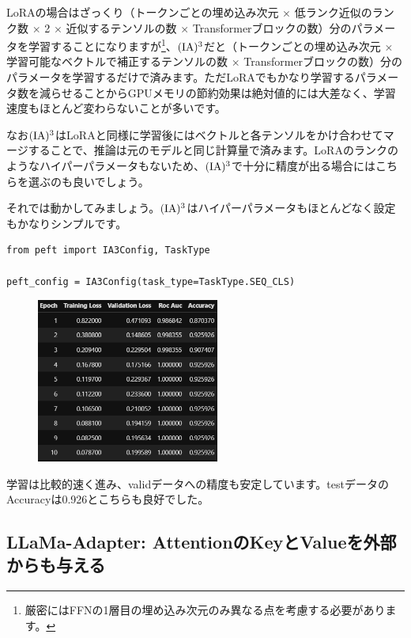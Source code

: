 \documentclass[a5paper,twoside,dvipdfmx]{jsarticle}
\begin{document}
LoRAの場合はざっくり（トークンごとの埋め込み次元 $\times$ 低ランク近似のランク数 $\times$ 2 $\times$ 近似するテンソルの数 $\times$ Transformerブロックの数）分のパラメータを学習することになりますが\footnote{厳密にはFFNの1層目の埋め込み次元のみ異なる点を考慮する必要があります。}、$\rm{(IA)^3}$だと（トークンごとの埋め込み次元 $\times$ 学習可能なベクトルで補正するテンソルの数 $\times$ Transformerブロックの数）分のパラメータを学習するだけで済みます。ただLoRAでもかなり学習するパラメータ数を減らせることからGPUメモリの節約効果は絶対値的には大差なく、学習速度もほとんど変わらないことが多いです。

なお$\rm{(IA)^3}$はLoRAと同様に学習後にはベクトルと各テンソルをかけ合わせてマージすることで、推論は元のモデルと同じ計算量で済みます。LoRAのランクのようなハイパーパラメータもないため、$\rm{(IA)^3}$で十分に精度が出る場合にはこちらを選ぶのも良いでしょう。

それでは動かしてみましょう。$\rm{(IA)^3}$はハイパーパラメータもほとんどなく設定もかなりシンプルです。

\begin{lstlisting}
from peft import IA3Config, TaskType
 
peft_config = IA3Config(task_type=TaskType.SEQ_CLS)
\end{lstlisting}


\newpage

\begin{figure}[h]
  \centering
  \includegraphics[width=60mm]{../C105Fig/gray/ia3_train.png}
 \end{figure} 

 
学習は比較的速く進み、validデータへの精度も安定しています。testデータのAccuracyは0.926とこちらも良好でした。


\subsection{LLaMa-Adapter: AttentionのKeyとValueを外部からも与える}
\end{document}

